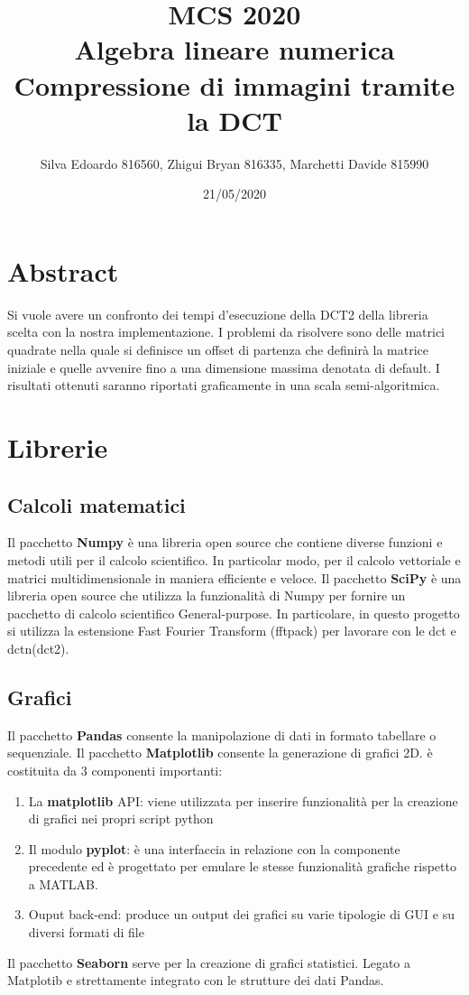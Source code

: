 \documentclass[12pt]{article}
\title{%
  MCS 2020 \\
  \large Algebra lineare numerica \\
   Compressione di immagini tramite la DCT}
\date{21/05/2020}
\author{Silva Edoardo 816560, Zhigui Bryan 816335, Marchetti Davide 815990}
\begin{document}
\maketitle


\section*{Abstract}
 	Si vuole avere un confronto dei tempi d’esecuzione della DCT2 della libreria scelta con la nostra implementazione. I problemi da risolvere sono delle matrici quadrate nella quale si definisce un offset di partenza che definirà la matrice iniziale e quelle avvenire fino a una dimensione massima denotata di default. 
I risultati ottenuti saranno riportati graficamente in una scala semi-algoritmica.

\section{Librerie}
	\subsection{Calcoli matematici}
	
Il pacchetto \textbf{Numpy} è una libreria open source che contiene diverse funzioni e metodi utili per il calcolo scientifico. In particolar modo, per il calcolo vettoriale e matrici multidimensionale in maniera efficiente e veloce.\newline
Il pacchetto \textbf{SciPy} è una libreria open source che utilizza la funzionalità di Numpy per fornire un pacchetto di calcolo scientifico General-purpose. In particolare, in questo progetto si utilizza la estensione Fast Fourier Transform (fftpack) per lavorare con le dct e dctn(dct2).

	\subsection{Grafici}
	
	Il pacchetto \textbf{Pandas} consente la manipolazione di dati in formato tabellare o sequenziale.\newline
	Il pacchetto \textbf{Matplotlib} consente la generazione di grafici 2D. è costituita da 3 componenti importanti:
	\begin{enumerate}
		\item La \textbf{matplotlib} API: viene utilizzata per inserire funzionalità per la creazione di grafici nei propri script python
		\item Il modulo \textbf{pyplot}: è una interfaccia in relazione con la componente precedente ed è progettato per emulare le stesse funzionalità grafiche rispetto a MATLAB.
		\item Ouput back-end: produce un output dei grafici su varie tipologie di GUI e su diversi formati di file
	\end{enumerate}
	Il pacchetto \textbf{Seaborn} serve per la creazione di grafici statistici. Legato a Matplotib e strettamente integrato con le strutture dei dati Pandas.
	
\end{document}
